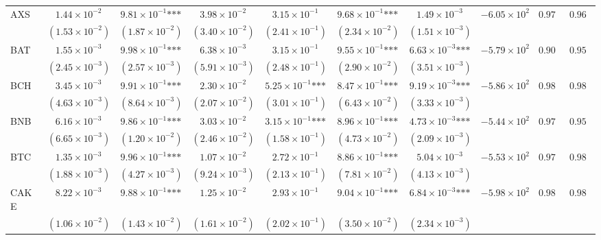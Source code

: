 \documentclass{article}
\begin{document}
\begin{landscape}
\begin{longtable}{lccccccccc}
AXS & $1.44\times 10^{-2}$ & $9.81\times 10^{-1}\text{***}$ & $3.98\times 10^{-2}$ & $3.15\times 10^{-1}$ & $9.68\times 10^{-1}\text{***}$ & $1.49\times 10^{-3}$ & $-6.05\times 10^{2}$ & $0.977$ & $0.969$ \\
 & $(1.53\times 10^{-2})$ & $(1.87\times 10^{-2})$ & $(3.40\times 10^{-2})$ & $(2.41\times 10^{-1})$ & $(2.34\times 10^{-2})$ & $(1.51\times 10^{-3})$ &  &  &  \\
BAT & $1.55\times 10^{-3}$ & $9.98\times 10^{-1}\text{***}$ & $6.38\times 10^{-3}$ & $3.15\times 10^{-1}$ & $9.55\times 10^{-1}\text{***}$ & $6.63\times 10^{-3}\text{***}$ & $-5.79\times 10^{2}$ & $0.903$ & $0.954$ \\
 & $(2.45\times 10^{-3})$ & $(2.57\times 10^{-3})$ & $(5.91\times 10^{-3})$ & $(2.48\times 10^{-1})$ & $(2.90\times 10^{-2})$ & $(3.51\times 10^{-3})$ &  &  &  \\
BCH & $3.45\times 10^{-3}$ & $9.91\times 10^{-1}\text{***}$ & $2.30\times 10^{-2}$ & $5.25\times 10^{-1}\text{***}$ & $8.47\times 10^{-1}\text{***}$ & $9.19\times 10^{-3}\text{***}$ & $-5.86\times 10^{2}$ & $0.984$ & $0.985$ \\
 & $(4.63\times 10^{-3})$ & $(8.64\times 10^{-3})$ & $(2.07\times 10^{-2})$ & $(3.01\times 10^{-1})$ & $(6.43\times 10^{-2})$ & $(3.33\times 10^{-3})$ &  &  &  \\
BNB & $6.16\times 10^{-3}$ & $9.86\times 10^{-1}\text{***}$ & $3.03\times 10^{-2}$ & $3.15\times 10^{-1}\text{***}$ & $8.96\times 10^{-1}\text{***}$ & $4.73\times 10^{-3}\text{***}$ & $-5.44\times 10^{2}$ & $0.976$ & $0.953$ \\
 & $(6.65\times 10^{-3})$ & $(1.20\times 10^{-2})$ & $(2.46\times 10^{-2})$ & $(1.58\times 10^{-1})$ & $(4.73\times 10^{-2})$ & $(2.09\times 10^{-3})$ &  &  &  \\
BTC & $1.35\times 10^{-3}$ & $9.96\times 10^{-1}\text{***}$ & $1.07\times 10^{-2}$ & $2.72\times 10^{-1}$ & $8.86\times 10^{-1}\text{***}$ & $5.04\times 10^{-3}$ & $-5.53\times 10^{2}$ & $0.977$ & $0.983$ \\
 & $(1.88\times 10^{-3})$ & $(4.27\times 10^{-3})$ & $(9.24\times 10^{-3})$ & $(2.13\times 10^{-1})$ & $(7.81\times 10^{-2})$ & $(4.13\times 10^{-3})$ &  &  &  \\
CAKE & $8.22\times 10^{-3}$ & $9.88\times 10^{-1}\text{***}$ & $1.25\times 10^{-2}$ & $2.93\times 10^{-1}$ & $9.04\times 10^{-1}\text{***}$ & $6.84\times 10^{-3}\text{***}$ & $-5.98\times 10^{2}$ & $0.986$ & $0.983$ \\
 & $(1.06\times 10^{-2})$ & $(1.43\times 10^{-2})$ & $(1.61\times 10^{-2})$ & $(2.02\times 10^{-1})$ & $(3.50\times 10^{-2})$ & $(2.34\times 10^{-3})$ &  &  &  \\

\end{longtable}
\end{landscape}
\end{document}
